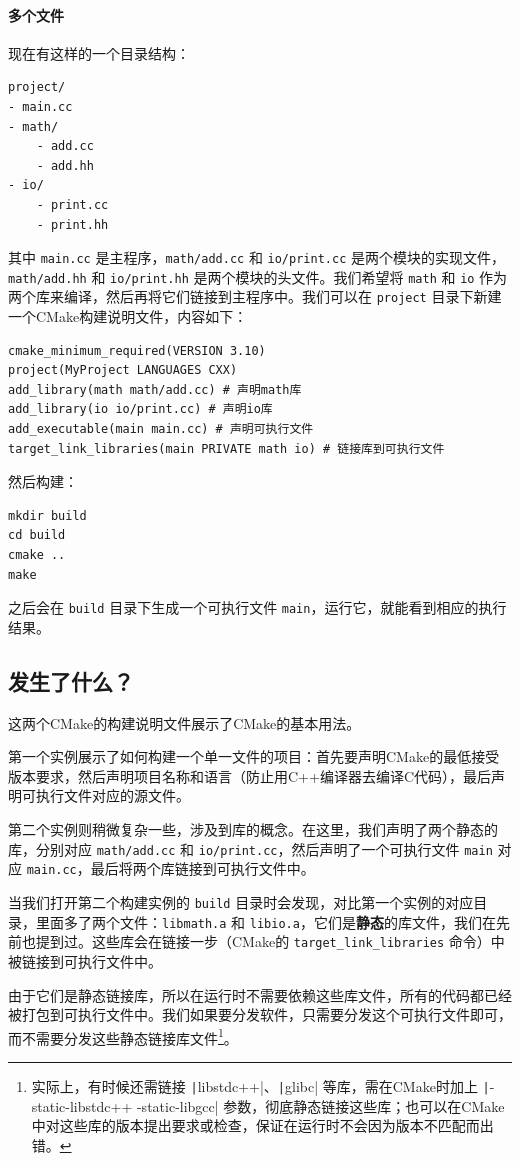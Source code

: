 \paragraph{多个文件} 现在有这样的一个目录结构：
\begin{verbatim}
project/
- main.cc
- math/
    - add.cc
    - add.hh
- io/
    - print.cc
    - print.hh
\end{verbatim}
其中 \verb|main.cc| 是主程序，\verb|math/add.cc| 和 \verb|io/print.cc| 是两个模块的实现文件，\verb|math/add.hh| 和 \verb|io/print.hh| 是两个模块的头文件。我们希望将 \verb|math| 和 \verb|io| 作为两个库来编译，然后再将它们链接到主程序中。我们可以在 \verb|project| 目录下新建一个CMake构建说明文件，内容如下：
\begin{verbatim}
cmake_minimum_required(VERSION 3.10)
project(MyProject LANGUAGES CXX)
add_library(math math/add.cc) # 声明math库
add_library(io io/print.cc) # 声明io库
add_executable(main main.cc) # 声明可执行文件
target_link_libraries(main PRIVATE math io) # 链接库到可执行文件
\end{verbatim}
然后构建：
\begin{verbatim}
mkdir build
cd build
cmake ..
make
\end{verbatim}
之后会在 \verb|build| 目录下生成一个可执行文件 \verb|main|，运行它，就能看到相应的执行结果。

\subsection{发生了什么？}

这两个CMake的构建说明文件展示了CMake的基本用法。

第一个实例展示了如何构建一个单一文件的项目：首先要声明CMake的最低接受版本要求，然后声明项目名称和语言（防止用C++编译器去编译C代码），最后声明可执行文件对应的源文件。

第二个实例则稍微复杂一些，涉及到库的概念。在这里，我们声明了两个静态的库，分别对应 \verb|math/add.cc| 和 \verb|io/print.cc|，然后声明了一个可执行文件 \verb|main| 对应 \verb|main.cc|，最后将两个库链接到可执行文件中。

当我们打开第二个构建实例的 \verb|build| 目录时会发现，对比第一个实例的对应目录，里面多了两个文件：\verb|libmath.a| 和 \verb|libio.a|，它们是\textbf{静态}的库文件，我们在先前也提到过。这些库会在链接一步（CMake的 \verb|target_link_libraries| 命令）中被链接到可执行文件中。

由于它们是静态链接库，所以在运行时不需要依赖这些库文件，所有的代码都已经被打包到可执行文件中。我们如果要分发软件，只需要分发这个可执行文件即可，而不需要分发这些静态链接库文件\footnote{实际上，有时候还需链接 \texttt|libstdc++|、\texttt|glibc| 等库，需在CMake时加上 \texttt|-static-libstdc++ -static-libgcc| 参数，彻底静态链接这些库；也可以在CMake中对这些库的版本提出要求或检查，保证在运行时不会因为版本不匹配而出错。}。

